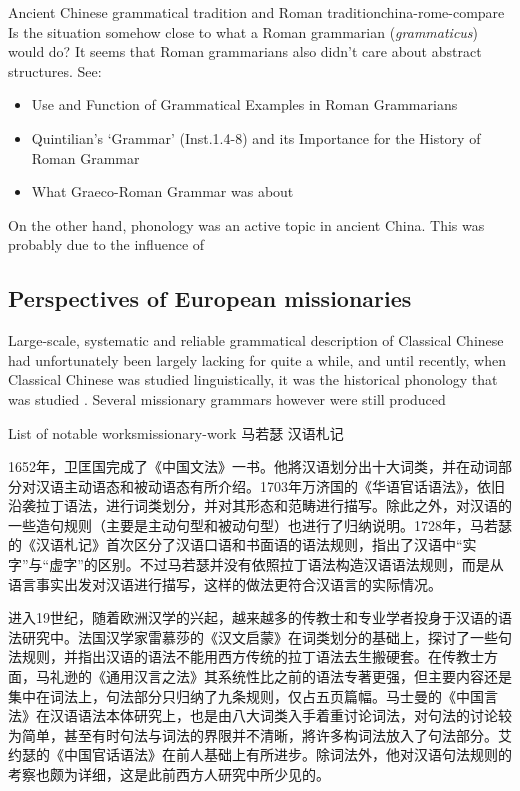 \documentclass[UTF8, a4paper, oneside, scheme=plain, 12pt]{ctexrep}
\newcommand*{\citepage}[1]{p.~{#1}}
\newcommand{\form}[1]{\emph{#1}}
\begin{document}
\begin{todobox}{Ancient Chinese grammatical tradition and Roman tradition}{china-rome-compare}
    Is the situation somehow close to what a Roman grammarian (\form{grammaticus}) would do?
    It seems that Roman grammarians also didn't care about abstract structures.
    See:
    \begin{itemize}
        \item Use and Function of Grammatical Examples in Roman Grammarians
        \item Quintilian’s ‘Grammar’ (Inst.1.4-8) and its Importance for the History of Roman Grammar
        \item What Graeco-Roman Grammar was about
    \end{itemize}
\end{todobox}

On the other hand, phonology was an active topic in ancient China.
This was probably due to the influence of 

\subsection{Perspectives of European missionaries}

Large-scale, systematic and reliable grammatical description of Classical Chinese had unfortunately been largely lacking for quite a while, and until recently, when Classical Chinese was studied linguistically, it was the historical phonology that was studied \citep[\citepage{xiii}]{pulleyblank1995outline}.
Several missionary grammars however were still produced 

\begin{todobox}{List of notable works}{missionary-work}
    马若瑟 汉语札记

    1652年，卫匡国完成了《中国文法》一书。他將汉语划分出十大词类，并在动词部分对汉语主动语态和被动语态有所介绍。1703年万济国的《华语官话语法》，依旧沿袭拉丁语法，进行词类划分，并对其形态和范畴进行描写。除此之外，对汉语的一些造句规则（主要是主动句型和被动句型）也进行了归纳说明。1728年，马若瑟的《汉语札记》首次区分了汉语口语和书面语的语法规则，指出了汉语中“实字”与“虚字”的区别。不过马若瑟并没有依照拉丁语法构造汉语语法规则，而是从语言事实出发对汉语进行描写，这样的做法更符合汉语言的实际情况。

    进入19世纪，随着欧洲汉学的兴起，越来越多的传教士和专业学者投身于汉语的语法研究中。法国汉学家雷慕莎的《汉文启蒙》在词类划分的基础上，探讨了一些句法规则，并指出汉语的语法不能用西方传统的拉丁语法去生搬硬套。在传教士方面，马礼逊的《通用汉言之法》其系统性比之前的语法专著更强，但主要内容还是集中在词法上，句法部分只归纳了九条规则，仅占五页篇幅。马士曼的《中国言法》在汉语语法本体研究上，也是由八大词类入手着重讨论词法，对句法的讨论较为简单，甚至有时句法与词法的界限并不清晰，將许多构词法放入了句法部分。艾约瑟的《中国官话语法》在前人基础上有所进步。除词法外，他对汉语句法规则的考察也颇为详细，这是此前西方人研究中所少见的。
\end{todobox}
\end{document}
